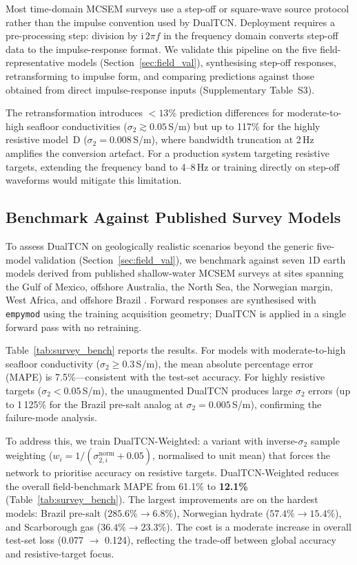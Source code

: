 \documentclass[journal]{IEEEtran}
\begin{document}
Most time-domain MCSEM surveys use a step-off or square-wave source
protocol rather than the impulse convention used by DualTCN.
Deployment requires a pre-processing step: division by
$\mathrm{i}\,2\pi f$ in the frequency domain converts step-off data
to the impulse-response format.  We validate this pipeline on the
five field-representative models (Section~\ref{sec:field_val}),
synthesising step-off responses, retransforming to impulse form, and
comparing predictions against those obtained from direct
impulse-response inputs (Supplementary Table~S3).

The retransformation introduces $< 13$\% prediction differences for
moderate-to-high seafloor conductivities
($\sigma_2 \gtrsim 0.05$\,S/m) but up to 117\% for the highly
resistive model~D ($\sigma_2 = 0.008$\,S/m), where bandwidth
truncation at 2\,Hz amplifies the conversion artefact.  For a
production system targeting resistive targets, extending the
frequency band to 4--8\,Hz or training directly on step-off waveforms
would mitigate this limitation.

\subsection{Benchmark Against Published Survey Models}
\label{sec:survey_benchmark}

To assess DualTCN on geologically realistic scenarios beyond the
generic five-model validation (Section~\ref{sec:field_val}), we
benchmark against seven 1D earth models derived from published
shallow-water MCSEM surveys at sites spanning the Gulf of Mexico,
offshore Australia, the North Sea, the Norwegian margin, West Africa,
and offshore Brazil
\citep{constable2006, key2009, constable2010ten, key2012marine}.
Forward responses are synthesised with \texttt{empymod} using the
training acquisition geometry; DualTCN is applied in a single forward
pass with no retraining.

Table~\ref{tab:survey_bench} reports the results.  For models with
moderate-to-high seafloor conductivity ($\sigma_2 \geq 0.3$\,S/m),
the mean absolute percentage error (MAPE) is 7.5\%---consistent with
the test-set accuracy.  For highly resistive targets
($\sigma_2 < 0.05$\,S/m), the unaugmented DualTCN produces large
$\sigma_2$ errors (up to 1\,125\% for the Brazil pre-salt analog at
$\sigma_2 = 0.005$\,S/m), confirming the failure-mode analysis.

To address this, we train DualTCN-Weighted: a variant with
inverse-$\sigma_2$ sample weighting ($w_i = 1/(\sigma_{2,i}^\mathrm{norm} + 0.05)$,
normalised to unit mean) that forces the network to prioritise
accuracy on resistive targets.  DualTCN-Weighted reduces the overall
field-benchmark MAPE from 61.1\% to \textbf{12.1\%}
(Table~\ref{tab:survey_bench}).  The largest improvements are on the
hardest models: Brazil pre-salt ($285.6\% \to 6.8\%$), Norwegian
hydrate ($57.4\% \to 15.4\%$), and Scarborough gas
($36.4\% \to 23.3\%$).  The cost is a moderate increase in
overall test-set loss (0.077 $\to$ 0.124), reflecting the trade-off
between global accuracy and resistive-target focus.
\end{document}
